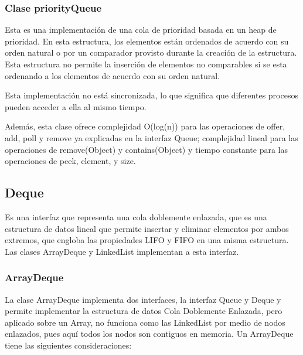 \documentclass[11pt]{article}
\begin{document}
\subsubsection{Clase priorityQueue}

\par

Esta es una implementación de una cola de prioridad basada en un heap 
de prioridad. En esta estructura, los elementos están ordenados de 
acuerdo con su orden natural o por un comparador provisto durante la 
creación de la estructura.  Esta estructura no permite la inserción 
de elementos no comparables si se esta ordenando a los elementos de 
acuerdo con su orden natural.

\par

Esta implementación no está sincronizada, lo que significa que 
diferentes procesos pueden acceder a ella al mismo tiempo.

\par

Además, esta clase ofrece complejidad O(log(n)) para las operaciones 
de offer, add, poll y remove ya explicadas en la interfaz Queue; 
complejidad lineal para las operaciones de remove(Object) y 
contains(Object) y tiempo constante para las operaciones de peek, 
element, y size.

\subsection{Deque}

\par

Es una interfaz que representa una cola doblemente enlazada, que es 
una estructura de datos lineal que permite insertar y eliminar 
elementos por ambos extremos, que engloba las propiedades LIFO y FIFO 
en una misma estructura. Las clases ArrayDeque y LinkedList 
implementan a esta interfaz. 

\subsubsection{ArrayDeque}

\par

La clase ArrayDeque implementa dos interfaces, la interfaz Queue y 
Deque y permite implementar la estructura de datos Cola Doblemente 
Enlazada, pero aplicado sobre un Array, no funciona como las 
LinkedList por medio de nodos enlazados, pues aquí todos los nodos 
son contiguos en memoria. Un ArrayDeque tiene las siguientes 
consideraciones:
\end{document}
